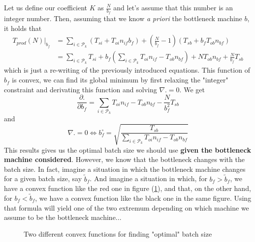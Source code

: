 Let us define our coefficient $K$ as $\frac{N}{b_f}$ and let's assume that this number is an integer number. Then, assuming that we know \textit{a priori} the bottleneck machine $b$, it holds that \[ \begin{split}
    T_{prod}(N)|_{b_f} &= \sum_{i\in\mathcal P_k} ( T_{si} + T_{oi}n_{if}b_f ) + \left( \frac{N}{b_f} - 1 \right)(T_{sb} + b_fT_{ob}n_{bf})\\
    &= \sum_{i\in\mathcal P_k} T_{si} + b_f\left( \sum_{i\in\mathcal P_k} T_{oi}n_{if} - T_{ob}n_{bf} \right) + NT_{ob}n_{bf} + \frac{N}{b_f}T_{sb}
    \end{split}
\] which is just a re-writing of the previously introduced equations. This function of $b_f$ is convex, we can find its global minimum by first relaxing the "integer" constraint and derivating this function and solving $\nabla . = 0$. We get
\[
    \frac{\partial .}{\partial b_f} = \sum_{i\in\mathcal P_k} T_{oi}n_{if} - T_{ob}n_{bf} - \frac{N}{b_f^2}T_{sb}
\] and \[
    \nabla . = 0 \Leftrightarrow b_f^\circ = \sqrt{ \frac{T_{sb}}{\sum_{i\in\mathcal P_k} T_{oi}n_{if} - T_{ob}n_{bf} } }
\]
This results gives us the optimal batch size we should use \textbf{given the bottleneck machine considered}. However, we know that the bottleneck changes with the batch size. In fact, imagine a situation in which the bottleneck machine changes for a given batch size, say $\tilde b_f$. And imagine a situation in which, for $b_f > \tilde b_f$, we have a convex function like the red one in figure (\ref{produced_i:convex}), and that, on the other hand, for $b_f < \tilde b_f$, we have a convex function like the black one in the same figure. Using that formula will yield one of the two extremum depending on which machine we assume to be the bottleneck machine...

\begin{figure}[h!]
    \centering
    \caption{\label{produced_i:convex}Two different convex functions for finding "optimal" batch size}
\end{figure}


